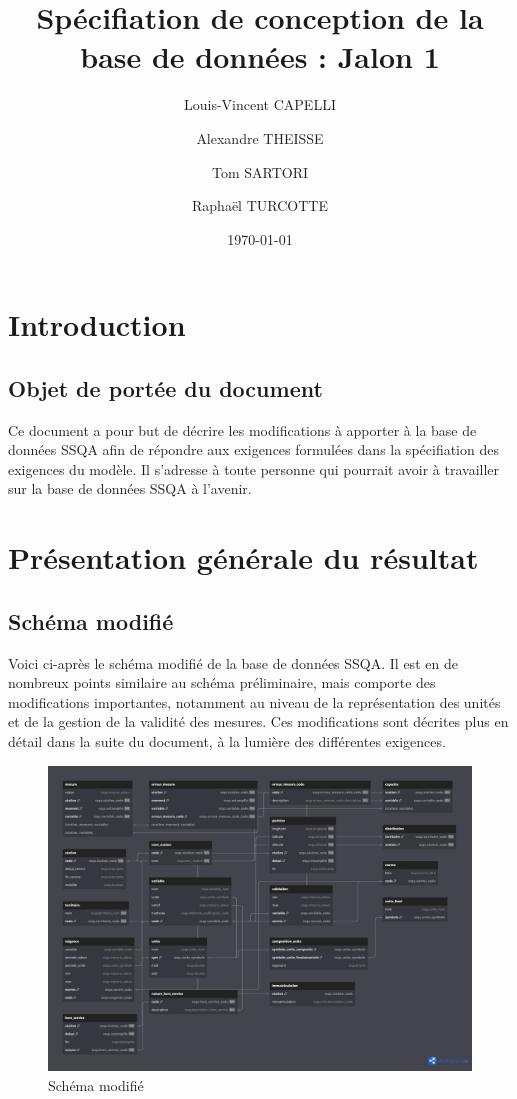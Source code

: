 \documentclass{article}
\begin{document}
\title{Spécifiation de conception de la base de données : Jalon 1}

\author{Louis-Vincent CAPELLI \and Alexandre THEISSE \and Tom SARTORI \and Raphaël TURCOTTE}
\date{\today}
\maketitle
\newpage

\tableofcontents
\newpage

\section{Introduction}
\subsection*{Objet de portée du document}
Ce document a pour but de décrire les modifications à apporter à la base de données
SSQA afin de répondre aux exigences formulées dans la
spécifiation des exigences du modèle.
Il s'adresse à toute personne qui pourrait avoir à travailler sur la base de données
SSQA à l'avenir.

\section{Présentation générale du résultat}
\subsection{Schéma modifié}
Voici ci-après le schéma modifié de la base de données SSQA. Il est en de
nombreux points similaire au schéma préliminaire, mais comporte des modifications
importantes, notamment au niveau de la représentation des unités et de la gestion
de la validité des mesures. Ces modifications sont décrites plus en détail dans
la suite du document, à la lumière des différentes exigences.

\begin{figure}[h]
\centering
\caption{Schéma modifié}
\includegraphics[scale=0.24]{modif.png}
\end{figure}
\end{document}
